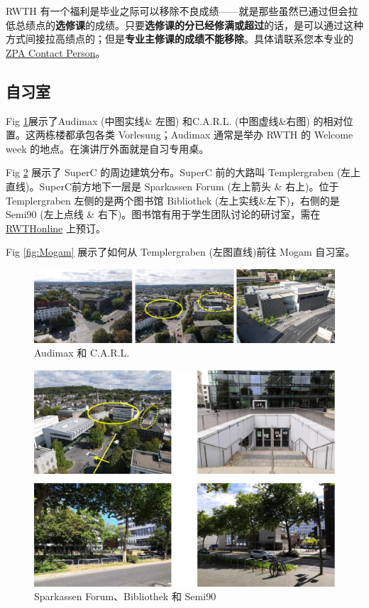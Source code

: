     RWTH 有一个福利是毕业之际可以移除不良成绩——就是那些虽然已通过但会拉低总绩点的\textbf{选修课}的成绩。只要\textbf{选修课的分已经修满或超过}的话，是可以通过这种方式间接拉高绩点的；但是\textbf{专业主修课的成绩不能移除}。具体请联系您本专业的 \href{https://www.rwth-aachen.de/go/id/cbcn/lidx/1}{ZPA Contact Person}。

  \subsection{自习室}\label{subsec:自习室}

    Fig \ref{fig:Audimax 和 C.A.R.L.}展示了Audimax (中图实线\& 左图) 和C.A.R.L. (中图虚线\&右图) 的相对位置。这两栋楼都承包各类 Vorlesung；Audimax 通常是举办 RWTH 的 Welcome week 的地点。在演讲厅外面就是自习专用桌。


    Fig \ref{fig:Sparkassen Forum、Bibliothek 和 Semi90} 展示了 SuperC 的周边建筑分布。SuperC 前的大路叫 Templergraben (左上直线)。SuperC前方地下一层是 Sparkassen Forum (左上箭头 \& 右上)。位于 Templergraben 左侧的是两个图书馆 Bibliothek (左上实线\&左下)，右侧的是 Semi90 (左上点线 \& 右下)。图书馆有用于学生团队讨论的研讨室，需在 \href{https://online.rwth-aachen.de/}{RWTHonline} 上预订。

    Fig \ref{fig:Mogam} 展示了如何从 Templergraben (左图直线)前往 Mogam 自习室。

    \begin{figure}[ht]
      \centering
      \includegraphics[width=\textwidth]{在亚琛学习和生活/Study/Audimax 和 C.A.R.L..png}
      \caption{Audimax 和 C.A.R.L.}
      \label{fig:Audimax 和 C.A.R.L.}
    \end{figure}

    \begin{figure}[ht]
      \centering
      \includegraphics[width=.8\textwidth]{在亚琛学习和生活/Study/Sparkassen Forum、Bibliothek 和 Semi90.png}
      \caption{Sparkassen Forum、Bibliothek 和 Semi90}
      \label{fig:Sparkassen Forum、Bibliothek 和 Semi90}
    \end{figure}

